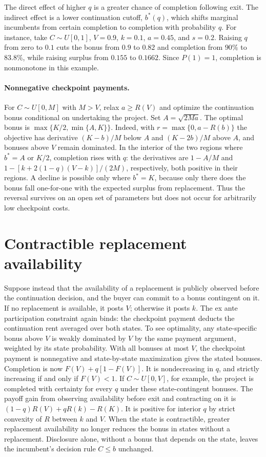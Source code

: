 \documentclass[11pt]{article}
\begin{document}
The direct effect of higher $q$ is a greater chance of completion following exit. The indirect effect is a lower continuation cutoff, $b^*(q)$, which shifts marginal incumbents from certain completion to completion with probability $q$. For instance, take $C\sim U[0,1]$, $V=0.9$, $k=0.1$, $a=0.45$, and $s=0.2$. Raising $q$ from zero to $0.1$ cuts the bonus from $0.9$ to $0.82$ and completion from $90\%$ to $83.8\%$, while raising surplus from $0.155$ to $0.1662$. Since $P(1)=1$, completion is nonmonotone in this example.

\paragraph{Nonnegative checkpoint payments.}
For $C\sim U[0,M]$ with $M>V$, relax $a\geq R(V)$ and optimize the continuation bonus conditional on undertaking the project. Set $A=\sqrt{2Ma}$. The optimal bonus is $\max\{K/2,\min\{A,K\}\}$. Indeed, with $r=\max\{0,a-R(b)\}$ the objective has derivative $(K-b)/M$ below $A$ and $(K-2b)/M$ above $A$, and bonuses above $V$ remain dominated. In the interior of the two regions where $b^*=A$ or $K/2$, completion rises with $q$: the derivatives are $1-A/M$ and $1-[k+2(1-q)(V-k)]/(2M)$, respectively, both positive in their regions. A decline is possible only where $b^*=K$, because only there does the bonus fall one-for-one with the expected surplus from replacement. Thus the reversal survives on an open set of parameters but does not occur for arbitrarily low checkpoint costs.

\section{Contractible replacement availability}\label{sec:timing}
Suppose instead that the availability of a replacement is publicly observed before the continuation decision, and the buyer can commit to a bonus contingent on it. If no replacement is available, it posts $V$; otherwise it posts $k$. The ex ante participation constraint again binds: the checkpoint payment deducts the continuation rent averaged over both states. To see optimality, any state-specific bonus above $V$ is weakly dominated by $V$ by the same payment argument, weighted by its state probability. With all bonuses at most $V$, the checkpoint payment is nonnegative and state-by-state maximization gives the stated bonuses. Completion is now $F(V)+q[1-F(V)]$. It is nondecreasing in $q$, and strictly increasing if and only if $F(V)<1$. If $C\sim U[0,V]$, for example, the project is completed with certainty for every $q$ under these state-contingent bonuses. The payoff gain from observing availability before exit and contracting on it is $(1-q)R(V)+qR(k)-R(K)$. It is positive for interior $q$ by strict convexity of $R$ between $k$ and $V$. When the state is contractible, greater replacement availability no longer reduces the bonus in states without a replacement. Disclosure alone, without a bonus that depends on the state, leaves the incumbent's decision rule $C\leq b$ unchanged.
\end{document}
